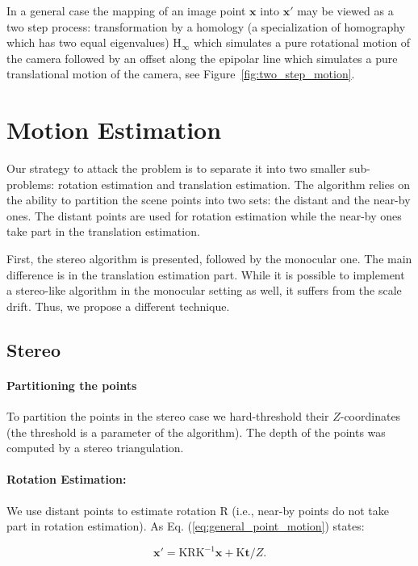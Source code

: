 \documentclass{bmvc2k}
\begin{document}
In a general case the mapping of an image point $\mathbf{x}$ into
$\mathbf{x}'$ may be viewed as a two step process: transformation by a
homology (a specialization of homography which has two equal
eigenvalues) $\mathrm{H_\infty}$ which simulates a pure rotational
motion of the camera followed by an offset along the epipolar line
which simulates a pure translational motion of the camera, see Figure~\ref{fig:two_step_motion}.

\section{Motion Estimation}\label{sec:moest}

Our strategy to attack the problem is to separate it into two smaller
sub-problems: rotation estimation and translation estimation. The
algorithm relies on the ability to partition the scene points into two
sets: the distant and the near-by ones.  The distant points are used
for rotation estimation while the near-by ones take part in the
translation estimation.

First, the stereo algorithm is presented, followed by the monocular
one.  The main difference is in the translation estimation part. While
it is possible to implement a stereo-like algorithm in the monocular
setting as well, it suffers from the scale drift.  Thus, we propose a
different technique.


\subsection{Stereo}\label{sec:stereo_moest}
\paragraph{Partitioning the points} To partition the points in the
stereo case we hard-threshold their $Z$-coordinates (the threshold is
a parameter of the algorithm).  The depth of the points was computed
by a stereo triangulation.

\paragraph{Rotation Estimation:}\label{sec:rotation_estimation}
We use distant points to estimate rotation $\mathrm{R}$ (i.e., near-by
points do not take part in rotation estimation). As Eq.
(\ref{eq:general_point_motion}) states:

\begin{equation}
  \mathbf{x}' = \mathrm{KRK^{-1}}\mathbf{x} + \mathrm{K}\mathbf{t}/Z.
\end{equation}
\end{document}
